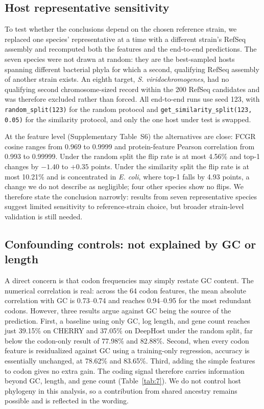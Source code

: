 \documentclass[utf8]{FrontiersinVancouver}
\begin{document}
\subsection{Host representative sensitivity}

To test whether the conclusions depend on the chosen reference strain, we replaced one species' representative at a time with a different strain's RefSeq assembly and recomputed both the features and the end-to-end predictions. The seven species were not drawn at random: they are the best-sampled hosts spanning different bacterial phyla for which a second, qualifying RefSeq assembly of another strain exists. An eighth target, \textit{S. viridochromogenes}, had no qualifying second chromosome-sized record within the 200 RefSeq candidates and was therefore excluded rather than forced. All end-to-end runs use seed 123, with \texttt{random\_split(123)} for the random protocol and \texttt{get\_similarity\_split(123, 0.05)} for the similarity protocol, and only the one host under test is swapped.

At the feature level (Supplementary Table~S6) the alternatives are close: FCGR cosine ranges from 0.969 to 0.9999 and protein-feature Pearson correlation from 0.993 to 0.99999. Under the random split the flip rate is at most 4.56\% and top-1 changes by $-1.40$ to $+0.35$ points. Under the similarity split the flip rate is at most 10.21\% and is concentrated in \textit{E. coli}, where top-1 falls by 4.93 points, a change we do not describe as negligible; four other species show no flips. We therefore state the conclusion narrowly: results from seven representative species suggest limited sensitivity to reference-strain choice, but broader strain-level validation is still needed.

\subsection{Confounding controls: not explained by GC or length}

A direct concern is that codon frequencies may simply restate GC content. The numerical correlation is real: across the 64 codon features, the mean absolute correlation with GC is 0.73--0.74 and reaches 0.94--0.95 for the most redundant codons. However, three results argue against GC being the source of the prediction. First, a baseline using only GC, log length, and gene count reaches just 39.15\% on CHERRY and 37.05\% on DeepHost under the random split, far below the codon-only result of 77.98\% and 82.88\%. Second, when every codon feature is residualized against GC using a training-only regression, accuracy is essentially unchanged, at 78.62\% and 83.65\%. Third, adding the simple features to codon gives no extra gain. The coding signal therefore carries information beyond GC, length, and gene count (Table~\ref{tab:7}). We do not control host phylogeny in this analysis, so a contribution from shared ancestry remains possible and is reflected in the wording.
\end{document}

